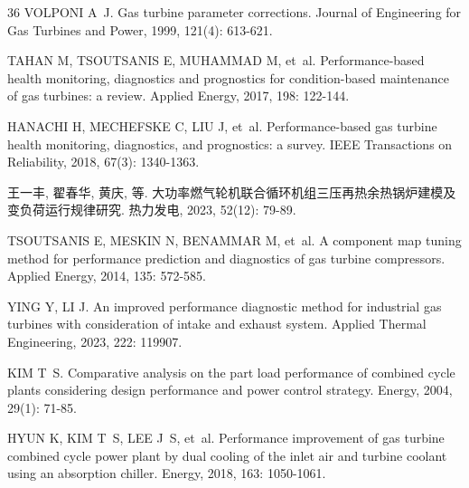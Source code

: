 \begin{thebibliography}{36}
VOLPONI A~J.
\newblock Gas turbine parameter corrections\allowbreak[J].
\newblock Journal of Engineering for Gas Turbines and Power, 1999,
  121\allowbreak (4): 613-621.

TAHAN M, TSOUTSANIS E, MUHAMMAD M, et~al.
\newblock Performance-based health monitoring, diagnostics and prognostics for
  condition-based maintenance of gas turbines: a review\allowbreak[J].
\newblock Applied Energy, 2017, 198: 122-144.

HANACHI H, MECHEFSKE C, LIU J, et~al.
\newblock Performance-based gas turbine health monitoring, diagnostics, and
  prognostics: a survey\allowbreak[J].
\newblock IEEE Transactions on Reliability, 2018, 67\allowbreak (3): 1340-1363.

王一丰, 翟春华, 黄庆, 等.
\newblock
  大功率燃气轮机联合循环机组三压再热余热锅炉建模及变负荷运行规律研究\allowbreak[J].
\newblock 热力发电, 2023, 52\allowbreak (12): 79-89.

TSOUTSANIS E, MESKIN N, BENAMMAR M, et~al.
\newblock A component map tuning method for performance prediction and
  diagnostics of gas turbine compressors\allowbreak[J].
\newblock Applied Energy, 2014, 135: 572-585.

YING Y, LI J.
\newblock An improved performance diagnostic method for industrial gas turbines
  with consideration of intake and exhaust system\allowbreak[J].
\newblock Applied Thermal Engineering, 2023, 222: 119907.

KIM T~S.
\newblock Comparative analysis on the part load performance of combined cycle
  plants considering design performance and power control
  strategy\allowbreak[J].
\newblock Energy, 2004, 29\allowbreak (1): 71-85.

HYUN K, KIM T~S, LEE J~S, et~al.
\newblock Performance improvement of gas turbine combined cycle power plant by
  dual cooling of the inlet air and turbine coolant using an absorption
  chiller\allowbreak[J].
\newblock Energy, 2018, 163: 1050-1061.


\end{thebibliography}

